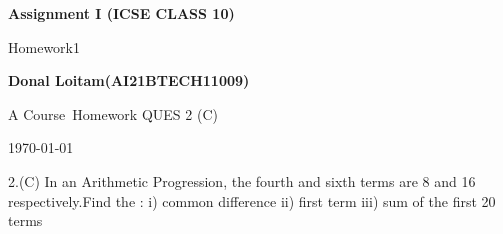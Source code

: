 \documentclass[11pt, journal, twocolumn]{IEEEtran}
\newcommand\course{Course}                      %
\newcommand\hwnumber{1}                         %
\begin{document}
\begin{titlepage}
    \begin{center}
        \vspace*{3cm}
            
        \Huge
        \textbf{Assignment I (ICSE CLASS 10)}
            
        \vspace{1cm}
        \huge
        Homework\hwnumber
            
        \vspace{1.5cm}
        \Large
            
        \textbf{Donal Loitam(AI21BTECH11009)}                     
        
            
        \vfill
        
        A \course \ Homework QUES 2 (C)
            
        \vspace{1cm}
            
       
       
        
        \Large
        
        \today
            
    \end{center}
\end{titlepage}


\newpage
\begin{Problem}
\large 2.(C) In an Arithmetic Progression, the fourth and sixth terms are 8 and 16 respectively.Find the :
 i) common difference
 ii) first term
 iii) sum of the first 20 terms
\end{Problem}
    
\end{document}
